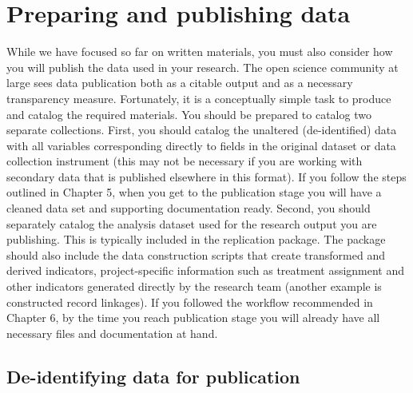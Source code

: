 
\section{Preparing and publishing data}

While we have focused so far on written materials,
you must also consider how you will publish
the data used in your research.
The open science community at large sees data publication
both as a citable output and as a necessary transparency measure.
Fortunately, it is a conceptually simple task to produce
and catalog the required materials.
You should be prepared to catalog two separate collections.
First, you should catalog the unaltered (de-identified) data
with all variables corresponding directly
to fields in the original dataset or data collection instrument
(this may not be necessary if you are working with secondary data that is published elsewhere in this format).
If you follow the steps outlined in Chapter 5,
when you get to the publication stage you will have
a cleaned data set and supporting documentation ready.
Second, you should separately catalog
the analysis dataset used for the research output you are publishing.
This is typically included in the replication package.
The package should also include the data construction scripts
that create transformed and derived indicators,
project-specific information
such as treatment assignment and other indicators
generated directly by the research team (another example is constructed record linkages).
If you followed the workflow recommended in Chapter 6,
by the time you reach publication stage you will already have all necessary
files and documentation at hand.

\subsection{De-identifying data for publication}


